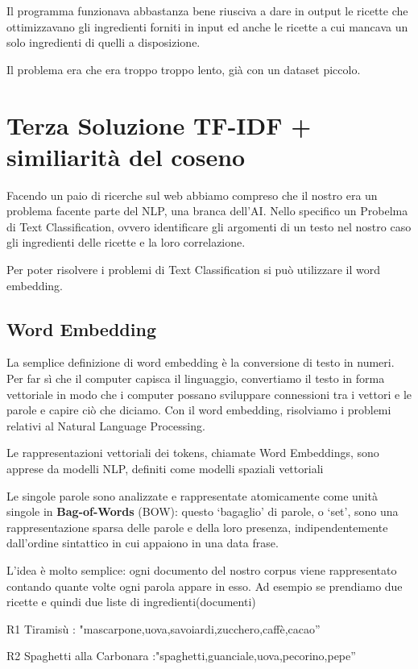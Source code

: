 \documentclass[12pt]{report}
\begin{document}
Il programma funzionava abbastanza bene riusciva a dare in output le ricette che ottimizzavano gli ingredienti forniti in input ed anche le ricette a cui mancava un solo ingredienti di quelli a disposizione. 

Il problema era che era troppo troppo lento, già con un dataset piccolo.

\chapter{Terza Soluzione TF-IDF + similiarità del coseno}

Facendo un paio di ricerche sul web abbiamo compreso che il nostro era un problema facente parte del NLP, una branca dell’AI.
Nello specifico un Probelma di Text Classification, ovvero identificare gli argomenti di un testo nel nostro caso gli ingredienti delle ricette e la loro correlazione.

Per poter risolvere i problemi di Text Classification si può utilizzare il word embedding.

\section{Word Embedding} 

La semplice definizione di word embedding è la conversione di testo in numeri. Per far sì che il computer capisca il linguaggio, convertiamo il testo in forma vettoriale in modo che i computer possano sviluppare connessioni tra i vettori e le parole e capire ciò che diciamo. Con il word embedding, risolviamo i problemi relativi al Natural Language Processing.

Le rappresentazioni vettoriali dei tokens, chiamate Word Embeddings, sono apprese da modelli NLP, definiti come modelli spaziali vettoriali

Le singole parole sono analizzate e rappresentate atomicamente come unità singole in 
\textbf{Bag-of-Words} (BOW): questo ‘bagaglio’ di parole, o ‘set’, sono una rappresentazione sparsa delle parole e della loro presenza, indipendentemente dall'ordine sintattico in cui appaiono in una data frase.

L'idea è molto semplice: ogni documento del nostro corpus viene rappresentato contando quante volte ogni parola appare in esso.
Ad esempio se prendiamo due ricette e quindi due liste di ingredienti(documenti) 

R1 Tiramisù : "mascarpone,uova,savoiardi,zucchero,caffè,cacao”

R2 Spaghetti alla Carbonara :"spaghetti,guanciale,uova,pecorino,pepe” 
\end{document}
